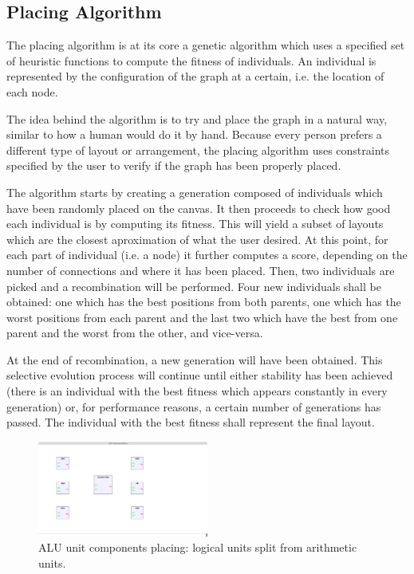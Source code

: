 \label{chap:impl}

\subsection{Placing Algorithm}
 
The placing algorithm is at its core a genetic algorithm \cite{back1997handbook} which uses
a specified set of heuristic functions to compute the fitness of individuals.
An individual is represented by the configuration of the graph at a certain, i.e.
the location of each node.

The idea behind the algorithm is to try and place the graph in a natural way, similar
to how a human would do it by hand. Because every person prefers a different type of 
layout or arrangement, the placing algorithm uses constraints specified by the user
to verify if the graph has been properly placed.

The algorithm starts by creating a generation composed of individuals which have 
been randomly placed on the canvas. It then proceeds to check how good each 
individual is by computing its fitness. This will yield a subset of layouts which
are the closest aproximation of what the user desired. At this point, for each 
part of individual (i.e. a node) it further computes a score, depending on the
number of connections and where it has been placed. Then, two individuals are 
picked and a recombination will be performed. Four new individuals shall be obtained:
one which has the best positions from both parents, one which has the worst positions
from each parent and the last two which have the best from one parent and the 
worst from the other, and vice-versa.

At the end of recombination, a new generation will have been obtained. This selective 
evolution process \cite{back1996evolutionary} will continue until either stability has been achieved (there is an
individual with the best fitness which appears constantly in every generation) or, for 
performance reasons, a certain number of generations has passed. The individual with 
the best fitness shall represent the final layout.

\begin{figure}[ht] \centering
\includegraphics[width=0.5\textwidth]{src/placingLogic.png}
\caption{ALU unit components placing: logical units split from arithmetic units.} \end{figure}

